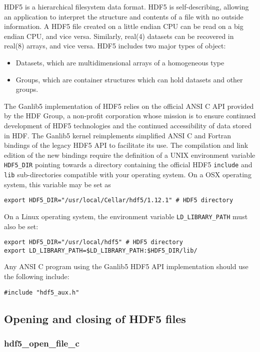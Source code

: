 HDF5 is a hierarchical filesystem data format. HDF5 is self-describing, allowing an application to interpret the structure and contents
of a file with no outside information. A HDF5 file created on a little endian CPU can be read on a big endian CPU, and vice versa.
Similarly, real(4) datasets can be recovered in real(8) arrays, and vice versa. HDF5 includes two major types of object:
\begin{itemize}
\item Datasets, which are multidimensional arrays of a homogeneous type
\item Groups, which are container structures which can hold datasets and other groups.
\end{itemize}
The Ganlib5 implementation of HDF5 relies on the official ANSI C API provided by the HDF Group, a non-profit corporation whose mission
is to ensure continued development of HDF5 technologies and the continued accessibility of data stored in HDF. The Ganlib5 kernel
reimplements simplified ANSI C and Fortran bindings of the legacy HDF5 API to facilitate its use. The compilation and link edition of the
new bindings require the definition of a UNIX environment variable {\tt HDF5\_DIR} pointing towards a directory containing the official HDF5
{\tt include} and {\tt lib} sub-directories compatible with your operating system. On a OSX operating system, this variable may be set as
\begin{verbatim}
export HDF5_DIR="/usr/local/Cellar/hdf5/1.12.1" # HDF5 directory
\end{verbatim}
\noindent On a Linux operating system, the environment variable {\tt LD\_LIBRARY\_PATH} must also be set:
\begin{verbatim}
export HDF5_DIR="/usr/local/hdf5" # HDF5 directory
export LD_LIBRARY_PATH=$LD_LIBRARY_PATH:$HDF5_DIR/lib/
\end{verbatim}

Any ANSI C program using the Ganlib5 HDF5 API implementation should use the following include:
\begin{verbatim}
#include "hdf5_aux.h"
\end{verbatim}

\vskip 0.08cm

\subsection{Opening and closing of HDF5 files}

\subsubsection{hdf5\_open\_file\_c}

